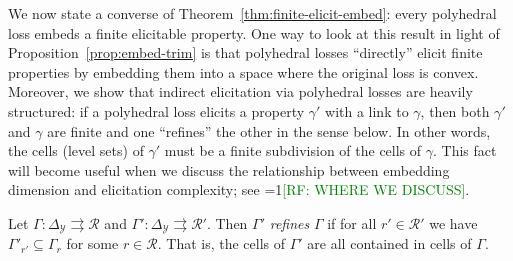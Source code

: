 \documentclass[anon,12pt]{colt2019}
\newcommand{\Comments}{1}
\newcommand{\mynote}[2]{\ifnum\Comments=1\textcolor{#1}{#2}\fi}
\newcommand{\raf}[1]{\mynote{green}{[RF: #1]}}
\newcommand{\simplex}{\Delta_\Y}
\newcommand{\R}{\mathcal{R}}
\newcommand{\Y}{\mathcal{Y}}
\newcommand{\toto}{\rightrightarrows}
\begin{document}
We now state a converse of Theorem~\ref{thm:finite-elicit-embed}: every polyhedral loss embeds a finite elicitable property.
One way to look at this result in light of Proposition~\ref{prop:embed-trim} is that polyhedral losses ``directly'' elicit finite properties by embedding them into a space where the original loss is convex.
Moreover, we show that indirect elicitation via polyhedral losses are heavily structured: if a polyhedral loss elicits a property $\gamma'$ with a link to $\gamma$, then both $\gamma'$ and $\gamma$ are finite and one ``refines'' the other in the sense below.
In other words, the cells (level sets) of $\gamma'$ must be a finite subdivision of the cells of $\gamma$.
This fact will become useful when we discuss the relationship between embedding dimension and elicitation complexity; see \raf{WHERE WE DISCUSS}.

\begin{definition}
  Let $\Gamma:\simplex\toto\R$ and $\Gamma':\simplex\toto\R'$.
  Then $\Gamma'$ \emph{refines} $\Gamma$ if for all $r'\in\R'$ we have $\Gamma'_{r'} \subseteq \Gamma_r$ for some $r\in\R$.
  That is, the cells of $\Gamma'$ are all contained in cells of $\Gamma$.
\end{definition}
\end{document}

